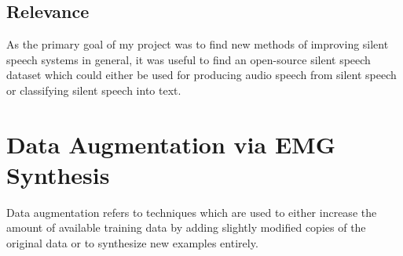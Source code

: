 \subsection{Relevance}

As the primary goal of my project was to find new methods of improving silent
speech systems in general, it was useful to find an open-source silent speech
dataset which could either be used for producing audio speech from silent
speech or classifying silent speech into text.

\section{Data Augmentation via EMG Synthesis}

Data augmentation refers to techniques which are used to either increase
the amount of available training data by adding slightly modified
copies of the original data or to synthesize new examples entirely.